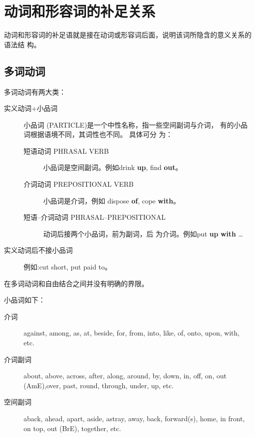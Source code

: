 
\section{动词和形容词的补足关系}

动词和形容词的补足语就是接在动词或形容词后面，说明该词所隐含的意义关系的语法结
构。

\subsection{多词动词}

多词动词有两大类：
\begin{description}
\item[实义动词+小品词] 小品词 (PARTICLE)是一个中性名称，指一些空间副词与介词，
  有的小品词根据语境不同，其词性也不同。 具体可分
  为：
  \begin{description}
  \item[短语动词 PHRASAL VERB] 小品词是空间副词。例如drink \textbf{up}, find
    \textbf{out}。

  \item[介词动词 PREPOSITIONAL VERB] 小品词是介词，例如 dispose \textbf{of},
    cope \textbf{with}。

  \item[短语--介词动词 PHRASAL--PREPOSITIONAL] 动词后接两个小品词，前为副词，后
    为介词。例如put
    \textbf{up} \textbf{with} \ldots{}
  \end{description}

\item[实义动词后不接小品词] 例如:cut short, put paid to。

\end{description}

在多词动词和自由结合之间并没有明确的界限。

小品词如下：
\begin{description}
\item[介词] against, among, as, at, beside, for, from, into, like, of, onto,
upon, with, etc.

\item[介词副词] about, above, across, after, along, around, by, down, in, off,
on, out (AmE),over, past, round, through, under, up, etc.

\item[空间副词] aback, ahead, apart, aside, astray, away, back, forward(s),
home, in front, on top, out (BrE), together, etc.

\end{description}

